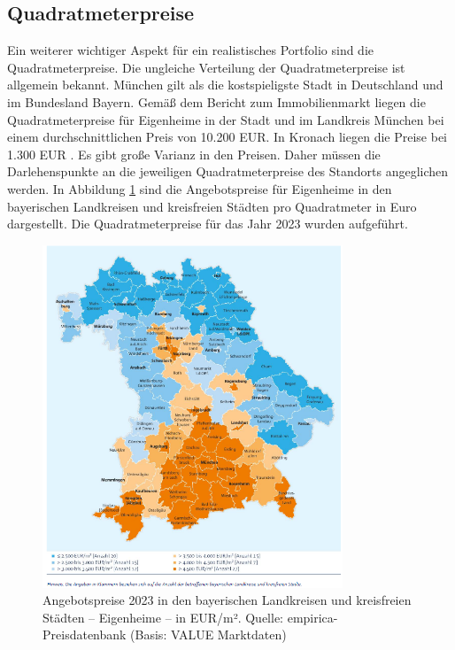 \subsection{Quadratmeterpreise}
Ein weiterer wichtiger Aspekt für ein realistisches Portfolio sind die Quadratmeterpreise. Die ungleiche Verteilung der Quadratmeterpreise ist allgemein bekannt. München gilt als die kostspieligste Stadt in Deutschland und im Bundesland Bayern. Gemäß dem Bericht zum Immobilienmarkt liegen die Quadratmeterpreise für Eigenheime in der Stadt und im Landkreis München bei einem durchschnittlichen Preis von 10.200 EUR. In Kronach liegen die Preise bei 1.300 EUR \parencite{bayernlabo2024}. Es gibt große Varianz in den Preisen. Daher müssen die Darlehenspunkte an die jeweiligen Quadratmeterpreise des Standorts angeglichen werden. In Abbildung \ref{fig:preis} sind die Angebotspreise für Eigenheime in den bayerischen Landkreisen und kreisfreien Städten pro Quadratmeter in Euro dargestellt. Die Quadratmeterpreise für das Jahr 2023 wurden aufgeführt.
\begin{figure}[htbp]
    \centering
    \includegraphics[width=0.8\textwidth]{figures/preism2.png}
    \caption{Angebotspreise 2023 in den bayerischen Landkreisen und kreisfreien Städten – Eigenheime – in EUR/m². Quelle: empirica-Preisdatenbank (Basis: VALUE Marktdaten) }
    \label{fig:preis}
\end{figure}
\FloatBarrier
